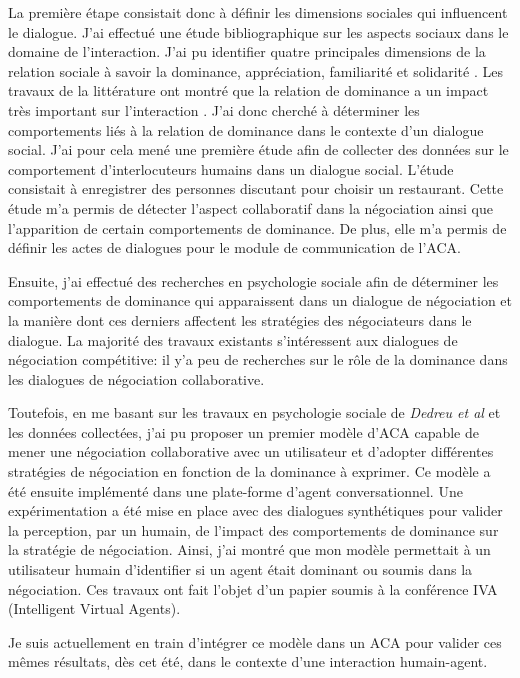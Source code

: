 \documentclass  [french] {article}
\begin{document}
	
	La première étape consistait donc à définir les dimensions sociales qui influencent le dialogue. J'ai effectué une étude bibliographique sur les aspects sociaux dans le domaine de l'interaction. J'ai pu identifier quatre principales dimensions de la relation sociale à savoir la dominance, appréciation, familiarité et solidarité \cite{de1995impact,de2004influence}. Les travaux de la littérature ont montré que la relation de dominance a un impact très important sur l'interaction \cite{bickmore2005establishing,kidd2005sociable,de2004influence}. J'ai donc cherché à déterminer les comportements liés à la relation de dominance dans le contexte d'un dialogue social. J'ai pour cela mené une première étude afin de collecter des données sur le comportement d'interlocuteurs humains dans un dialogue social. L'étude consistait à enregistrer des personnes discutant pour choisir un restaurant. Cette étude  m'a permis de détecter l’aspect collaboratif dans la négociation ainsi que l’apparition de certain comportements de dominance. De plus, elle  m'a permis de définir les actes de dialogues pour le module de communication de l'ACA. 
	
	Ensuite, j'ai effectué des recherches en psychologie sociale afin de déterminer les comportements de dominance qui apparaissent dans un dialogue de négociation et la manière  dont ces derniers affectent les stratégies des négociateurs dans le dialogue. La majorité des travaux existants s'intéressent aux dialogues de négociation compétitive: il y'a peu de recherches sur le rôle de la dominance dans les dialogues de négociation collaborative. 
	
	Toutefois, en me basant sur les travaux en psychologie sociale de \emph{Dedreu et al} et les données collectées, j'ai pu proposer un premier modèle d'ACA capable de mener une négociation collaborative avec un utilisateur et d'adopter différentes stratégies de négociation en fonction de la dominance à exprimer.  Ce modèle a été ensuite implémenté dans une plate-forme d'agent conversationnel. Une expérimentation a été mise en place avec des dialogues synthétiques pour valider la perception, par un humain, de l'impact des comportements de dominance sur la stratégie de négociation. Ainsi, j'ai montré que mon modèle permettait à un utilisateur humain d'identifier si un agent était dominant ou soumis dans la négociation. Ces travaux ont fait l'objet d'un papier soumis à la conférence IVA (Intelligent Virtual Agents).
	
	Je suis actuellement en train d'intégrer ce modèle dans un ACA pour valider ces mêmes résultats, dès cet été, dans le contexte d'une interaction humain-agent.
	
\end{document}
